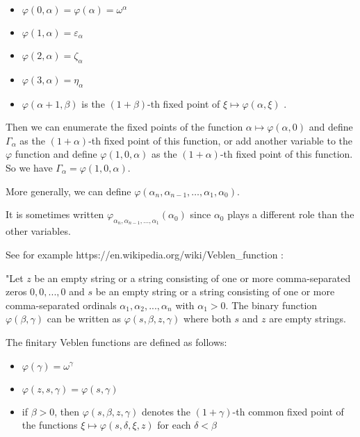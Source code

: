 \documentclass[10pt]{article}
\begin{document}
\begin{itemize}
     \setlength{\itemsep}{1pt}
     \setlength{\parskip}{0pt}
     \setlength{\parsep}{0pt}

\item \( \varphi(0,\alpha) = \varphi(\alpha) = \omega^\alpha \)

\item \( \varphi(1,\alpha) = \varepsilon_\alpha \)

\item \( \varphi(2,\alpha) = \zeta_\alpha \)

\item \( \varphi(3,\alpha) = \eta_\alpha \)

\item \( \varphi(\alpha+1,\beta) \) is the \( (1+\beta) \)-th fixed point of \( \xi \mapsto \varphi(\alpha,\xi) \) .

\end{itemize}

Then we can enumerate the fixed points of the function \( \alpha \mapsto \varphi(\alpha,0) \) and define \( \Gamma_\alpha \) as the \( (1+\alpha) \)-th fixed point of this function, or add another variable to the \( \varphi \) function 
and define \( \varphi(1,0,\alpha) \) as the \( (1+\alpha) \)-th fixed point of this function. So we have \( \Gamma_\alpha = \varphi(1,0,\alpha) \).

More generally, we can define \( \varphi(\alpha_n, \alpha_{n-1}, \ldots, \alpha_1, \alpha_0) \). 

It is sometimes written \( \varphi_{\alpha_n,\alpha_{n-1},\ldots,\alpha_1}(\alpha_0) \) since \( \alpha_0 \) plays a different role than the other variables.

See for example https://en.wikipedia.org/wiki/Veblen\_function :

"Let \(z\) be an empty string or a string consisting of one or more comma-separated zeros \(0,0,...,0\) and \(s\) be an empty string or a string consisting of one or more comma-separated ordinals \(\alpha _{1},\alpha _{2},...,\alpha _{n}\) with \(\alpha _{1}>0\). The binary function \(\varphi (\beta ,\gamma )\) can be written as \(\varphi (s,\beta ,z,\gamma )\) where both \(s\) and \(z\) are empty strings.

The finitary Veblen functions are defined as follows:

\begin{itemize}
     \setlength{\itemsep}{1pt}
     \setlength{\parskip}{0pt}
     \setlength{\parsep}{0pt}

\item \(\varphi (\gamma )=\omega ^{\gamma }\)
\item \(\varphi (z,s,\gamma )=\varphi (s,\gamma )\)
\item if \(\beta >0\), then \(\varphi (s,\beta ,z,\gamma )\) denotes the \((1+\gamma )\)-th common fixed point of the functions \(\xi \mapsto \varphi (s,\delta ,\xi ,z)\) for each \(\delta <\beta\)

\end{itemize}
\end{document}

